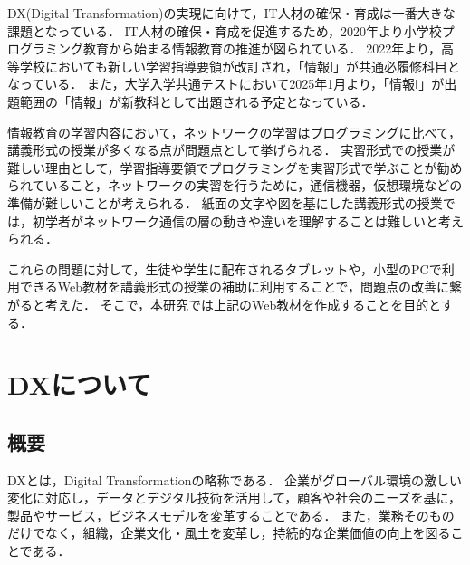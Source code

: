 \documentclass[12pt,a4j,titlepage]{ltjsarticle}
\begin{document}
DX(Digital Transformation)の実現に向けて，IT人材の確保・育成は一番大きな課題となっている．
IT人材の確保・育成を促進するため，2020年より小学校プログラミング教育から始まる情報教育の推進が図られている．
2022年より，高等学校においても新しい学習指導要領が改訂され，「情報Ⅰ」が共通必履修科目となっている．
また，大学入学共通テストにおいて2025年1月より，「情報Ⅰ」が出題範囲の「情報」が新教科として出題される予定となっている．

情報教育の学習内容において，ネットワークの学習はプログラミングに比べて，講義形式の授業が多くなる点が問題点として挙げられる．
実習形式での授業が難しい理由として，学習指導要領でプログラミングを実習形式で学ぶことが勧められていること，ネットワークの実習を行うために，通信機器，仮想環境などの準備が難しいことが考えられる．
紙面の文字や図を基にした講義形式の授業では，初学者がネットワーク通信の層の動きや違いを理解することは難しいと考えられる．

これらの問題に対して，生徒や学生に配布されるタブレットや，小型のPCで利用できるWeb教材を講義形式の授業の補助に利用することで，問題点の改善に繋がると考えた．
そこで，本研究では上記のWeb教材を作成することを目的とする．
\clearpage

\section{DXについて}%
\subsection{概要}
DXとは，Digital Transformationの略称である．
企業がグローバル環境の激しい変化に対応し，データとデジタル技術を活用して，顧客や社会のニーズを基に，製品やサービス，ビジネスモデルを変革することである．
また，業務そのものだけでなく，組織，企業文化・風土を変革し，持続的な企業価値の向上を図ることである\cite{dx_gaiyou}． 
\end{document}
